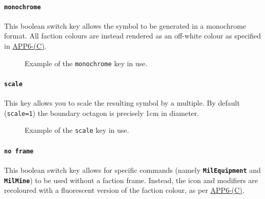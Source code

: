 \documentclass[a4paper, titlepage]{article}
\newcommand\DocLink{\href{https://www.awl.edu.pl/images/en/APP_6_C.pdf}{APP6-(C)}}
\begin{document}
\paragraph{\texttt{monochrome}}

This boolean switch key allows the symbol to be generated in a monochrome format. All faction colours are instead rendered as an off-white colour as specified in \DocLink. 

\begin{figure}[H]
\centering
{}
\caption{Example of the \texttt{monochrome} key in use.}
\end{figure}

\paragraph{\texttt{scale}}

This key allows you to scale the resulting symbol by a multiple. By default (\texttt{scale=1}) the boundary octagon is precisely 1cm in diameter.

\begin{figure}[H]
\centering
{}
\caption{Example of the \texttt{scale} key in use.}
\end{figure}

\paragraph{\texttt{no frame}}

This boolean switch key allows for specific commands (namely \textbf{\texttt{MilEquipment}} and \textbf{\texttt{MilMine}}) to be used without a faction frame. Instead, the icon and modifiers are recoloured with a fluorescent version of the faction colour, as per \DocLink.
\end{document}
